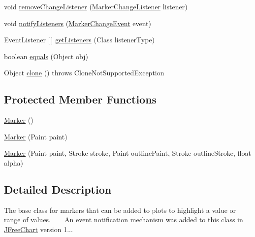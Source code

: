 \begin{DoxyCompactItemize}
\item 
void \mbox{\hyperlink{classorg_1_1jfree_1_1chart_1_1plot_1_1_marker_a72e865426bd73ef0496079561882a93f}{remove\+Change\+Listener}} (\mbox{\hyperlink{interfaceorg_1_1jfree_1_1chart_1_1event_1_1_marker_change_listener}{Marker\+Change\+Listener}} listener)
\item 
void \mbox{\hyperlink{classorg_1_1jfree_1_1chart_1_1plot_1_1_marker_a62c5f06ab3e1267acdd958697685593b}{notify\+Listeners}} (\mbox{\hyperlink{classorg_1_1jfree_1_1chart_1_1event_1_1_marker_change_event}{Marker\+Change\+Event}} event)
\item 
Event\+Listener \mbox{[}$\,$\mbox{]} \mbox{\hyperlink{classorg_1_1jfree_1_1chart_1_1plot_1_1_marker_a5af157ed82b110dc88e0ef6f5b60f70c}{get\+Listeners}} (Class listener\+Type)
\item 
boolean \mbox{\hyperlink{classorg_1_1jfree_1_1chart_1_1plot_1_1_marker_a74eb2445df6f0af6c1500859c8a69789}{equals}} (Object obj)
\item 
Object \mbox{\hyperlink{classorg_1_1jfree_1_1chart_1_1plot_1_1_marker_a6ce06121b0881f318dced842cc1c32d7}{clone}} ()  throws Clone\+Not\+Supported\+Exception 
\end{DoxyCompactItemize}
\subsection*{Protected Member Functions}
\begin{DoxyCompactItemize}
\item 
\mbox{\hyperlink{classorg_1_1jfree_1_1chart_1_1plot_1_1_marker_a920e950128e485bed9801094a36fe0ea}{Marker}} ()
\item 
\mbox{\hyperlink{classorg_1_1jfree_1_1chart_1_1plot_1_1_marker_a0f144c492907d3b68b6d2d0ca204f564}{Marker}} (Paint paint)
\item 
\mbox{\hyperlink{classorg_1_1jfree_1_1chart_1_1plot_1_1_marker_ad0829da7fd6b86573d9b19006e5038be}{Marker}} (Paint paint, Stroke stroke, Paint outline\+Paint, Stroke outline\+Stroke, float alpha)
\end{DoxyCompactItemize}


\subsection{Detailed Description}
The base class for markers that can be added to plots to highlight a value or range of values. ~\newline
~\newline
 An event notification mechanism was added to this class in \mbox{\hyperlink{classorg_1_1jfree_1_1chart_1_1_j_free_chart}{J\+Free\+Chart}} version 1... 

